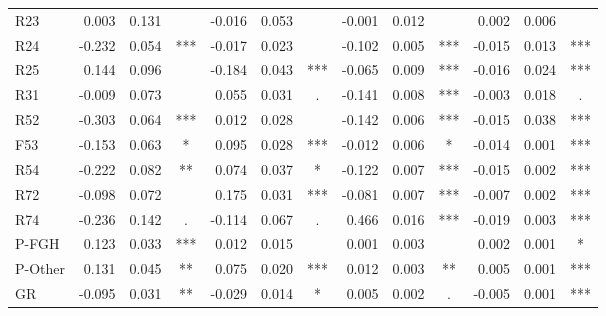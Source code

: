 \documentclass[11pt,letterpaper]{article}
\numberwithin{equation}{section}
\numberwithin{equation}{section}
\numberwithin{equation}{section}
\begin{document}
\begin{center}
\begin{table}
\begin{tabular}{|l|rrc|rrc|rrc|rrc|}
R23       & 0.003 & 0.131  &     & -0.016 & 0.053 &     & -0.001 & 0.012 &     & 0.002  & 0.006 &     \\
R24       & -0.232 & 0.054 & *** & -0.017 & 0.023 &     & -0.102 & 0.005 & *** & -0.015 & 0.013 & *** \\
R25       & 0.144  & 0.096 &     & -0.184 & 0.043 & *** & -0.065 & 0.009 & *** & -0.016 & 0.024 & *** \\
R31       & -0.009 & 0.073 &     & 0.055  & 0.031 & .   & -0.141 & 0.008 & *** & -0.003 & 0.018 & .   \\
R52       & -0.303 & 0.064 & *** & 0.012   & 0.028 &     & -0.142 & 0.006  & *** & -0.015 & 0.038 & *** \\
F53       & -0.153 & 0.063 & *   & 0.095  & 0.028 & *** & -0.012 & 0.006  & *   & -0.014 & 0.001 & *** \\
R54       & -0.222 & 0.082 & **  & 0.074  & 0.037 & *   & -0.122 & 0.007 & *** & -0.015  & 0.002 & *** \\
R72       & -0.098 & 0.072 &     & 0.175  & 0.031 & *** & -0.081 & 0.007 & *** & -0.007 & 0.002 & *** \\
R74       & -0.236 & 0.142 & .   & -0.114 & 0.067 & .   & 0.466  & 0.016 & *** & -0.019 & 0.003 & *** \\
P-FGH     & 0.123 & 0.033 & *** & 0.012 & 0.015 &     & 0.001    & 0.003 &     & 0.002  & 0.001 & *   \\
P-Other   & 0.131  & 0.045 & **  & 0.075   & 0.020 & *** & 0.012  & 0.003 & **  & 0.005  & 0.001  & *** \\
GR        & -0.095 & 0.031 & **  & -0.029 & 0.014 & *   & 0.005   & 0.002 & .   & -0.005 & 0.001 & *** \\
\hline\hline
\end{tabular}
\end{table}


\end{center}
\end{document}
